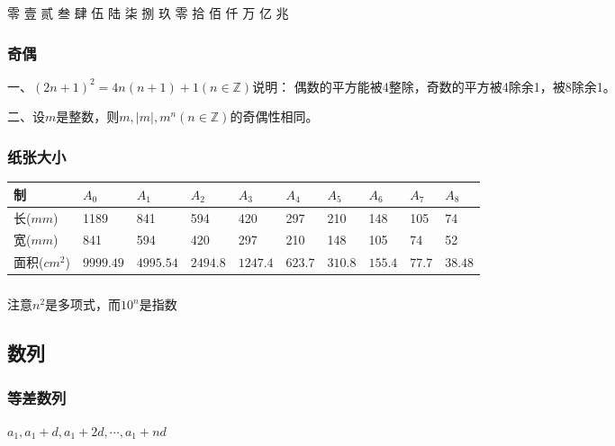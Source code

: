 \documentclass[UTF8]{ctexart}
\begin{document}
零 壹	贰	叁	肆	伍	陆	柒	捌  玖  零  拾  佰  仟  万  亿  兆

\subsubsection{奇偶}

一、$(2n+1)^2=4n(n+1)+1(n \in \mathbb{Z})$说明：
偶数的平方能被4整除，奇数的平方被4除余1，被8除余1。

二、设$m$是整数，则$m,\left | m \right | ,m^{n} (n\in \mathbb{Z})$的奇偶性相同。

\subsubsection{纸张大小}


\begin{table}[H]
\begin{tabular}{|l|lllllllll|}
\hline
制 & \multicolumn{1}{l|}{$A_{0}$} & \multicolumn{1}{l|}{$A_{1}$} & \multicolumn{1}{l|}{$A_{2}$} &
\multicolumn{1}{l|}{$A_{3}$} & \multicolumn{1}{l|}{$A_{4}$} & \multicolumn{1}{l|}{$A_{5}$} &
\multicolumn{1}{l|}{$A_{6}$} & \multicolumn{1}{l|}{$A_{7}$} & $A _{8}$ \\ \hline
长($mm$) & 1189 & 841 & 594 & 420 & 297 & 210 & 148 & 105 & 74 \\
宽($mm$) & 841 & 594 & 420 & 297 & 210 & 148 & 105 & 74 & 52 \\
面积($cm^2$) & $9999.49 $ & $4995.54 $ & $2494.8 $ & $ 1247.4 $ & $ 623.7 $ & $310.8 $ & $155.4 $ &
$77.7 $ & $38.48 $\\ \hline
\end{tabular}
\end{table}

\subsubsection{}

注意$n^2$是多项式，而$10^n$是指数

\subsection{数列}

\subsubsection{等差数列}

${a_{1},a_{1}+d, a_{1}+2d,\cdots,a_{1}+nd}$
\end{document}
